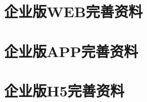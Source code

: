 
\section{企业版WEB完善资料} 
\label{sec:update_web}


\section{企业版APP完善资料} 
\label{sec:update_app}


\section{企业版H5完善资料} 
\label{sec:update_h5}

